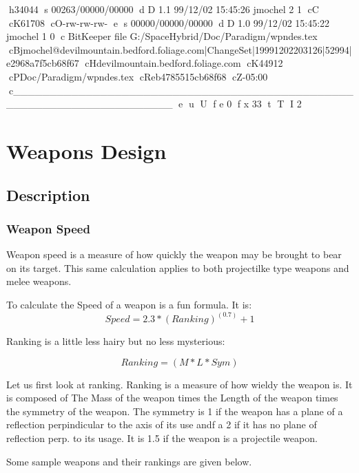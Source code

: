 h34044
s 00263/00000/00000
d D 1.1 99/12/02 15:45:26 jmochel 2 1
cC
cK61708
cO-rw-rw-rw-
e
s 00000/00000/00000
d D 1.0 99/12/02 15:45:22 jmochel 1 0
c BitKeeper file G:/SpaceHybrid/Doc/Paradigm/wpndes.tex
cBjmochel@devilmountain.bedford.foliage.com|ChangeSet|19991202203126|52994|e2968a7f5cb68f67
cHdevilmountain.bedford.foliage.com
cK44912
cPDoc/Paradigm/wpndes.tex
cReb4785515cb68f68
cZ-05:00
c______________________________________________________________________
e
u
U
f e 0
f x 33
t
T
I 2
\chapter{Weapons Design}

\section{Description}
\subsection{Weapon Speed}
Weapon speed is a measure of how quickly the weapon may be brought 
to bear on its target. This same calculation applies to both 
projectilke type weapons and melee weapons.

To calculate the Speed of a weapon is a fun formula. It is:
\[Speed = 2.3*(Ranking)^{(0.7)}+1\]

Ranking is a little less hairy but no less mysterious:

\[Ranking = (M*L*Sym)\]

Let us first look at ranking. Ranking is a measure of how wieldy the 
weapon is. It is composed of The Mass of the weapon times the Length 
of the weapon times the symmetry of the weapon. The symmetry is 1 if 
the weapon has a plane of a reflection perpindicular to the axis of 
its use andf a 2 if it has no plane of reflection perp. to its usage.
It is 1.5 if the weapon is a projectile weapon.

Some sample weapons and their rankings are given below.

